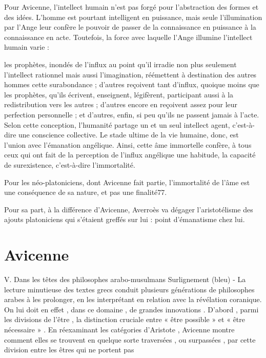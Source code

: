 Pour Avicenne, l'intellect humain n'est pas forgé pour l'abstraction des formes et des idées. L'homme est pourtant intelligent en puissance, mais seule l'illumination par l'Ange leur confère le pouvoir de passer de la connaissance en puissance à la connaissance en acte. Toutefois, la force avec laquelle l'Ange illumine l'intellect humain varie :

les prophètes, inondés de l'influx au point qu'il irradie non plus seulement l'intellect rationnel mais aussi l'imagination, réémettent à destination des autres hommes cette surabondance ;
d'autres reçoivent tant d'influx, quoique moins que les prophètes, qu'ils écrivent, enseignent, légifèrent, participant aussi à la redistribution vers les autres ;
d'autres encore en reçoivent assez pour leur perfection personnelle ;
et d'autres, enfin, si peu qu'ils ne passent jamais à l'acte.
Selon cette conception, l'humanité partage un et un seul intellect agent, c'est-à-dire une conscience collective. Le stade ultime de la vie humaine, donc, est l'union avec l'émanation angélique. Ainsi, cette âme immortelle confère, à tous ceux qui ont fait de la perception de l'influx angélique une habitude, la capacité de surexistence, c'est-à-dire l'immortalité.

Pour les néo-platoniciens, dont Avicenne fait partie, l'immortalité de l'âme est une conséquence de sa nature, et pas une finalité77.

Pour sa part, à la différence d'Avicenne, Averroès va dégager l'aristotélisme des ajouts platoniciens qui s'étaient greffés sur lui : point d'émanatisme chez lui.


\section{Avicenne}
\cite{PolDroit:voyage}

V. Dans les têtes des philo­sophes arabo-musulmans
Surlignement (bleu) - La lecture minutieuse des textes grecs conduit plusieurs générations de philo­sophes arabes à les prolonger, en les interprétant en relation avec la révélation coranique. 
On lui doit en effet , dans ce domaine , de grandes innovations . D’abord , parmi les divisions de l’être , la distinction cruciale entre « être possible » et « être nécessaire » . En réexaminant les catégories d’Aristote , Avicenne montre comment elles se trouvent en quelque sorte traversées , ou surpassées , par cette division entre les êtres qui ne portent pas
 
